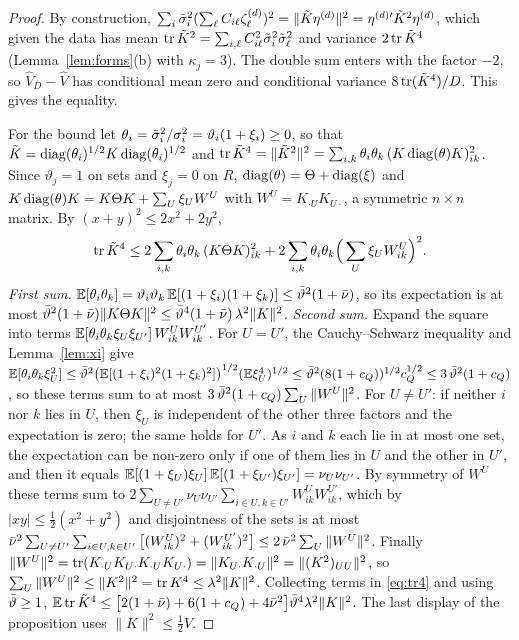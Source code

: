 \begin{proof}
By construction,
$\sum_i\tilde\sigma_i^2(\sum_\ell C_{i\ell}\zeta^{(d)}_\ell)^2=\|\tilde K\eta^{(d)}\|^2=\eta^{(d)\prime}\tilde K^2\eta^{(d)}$,
which given the data has mean $\operatorname{tr}\tilde K^2=\sum_{i,\ell}C_{i\ell}^2\tilde\sigma_i^2\tilde\sigma_\ell^2$ and variance
$2\operatorname{tr}\tilde K^4$ (Lemma~\ref{lem:forms}(b) with $\kappa_j=3$). The double sum enters with the factor
$-2$, so $\hat V_D-\hat V$ has conditional mean zero and conditional variance $8\operatorname{tr}(\tilde K^4)/D$.
This gives the equality.

For the bound let $\theta_i=\tilde\sigma_i^2/\sigma_i^2=\vartheta_i(1+\xi_i)\ge0$, so that
$\tilde K=\operatorname{diag}(\theta_i)^{1/2}K\operatorname{diag}(\theta_i)^{1/2}$ and
$\operatorname{tr}\tilde K^4=\|\tilde K^2\|^2=\sum_{i,k}\theta_i\theta_k\,(K\operatorname{diag}(\theta)K)_{ik}^2$. Since $\vartheta_j=1$ on
sets and $\xi_j=0$ on $R$, $\operatorname{diag}(\theta)=\Theta+\operatorname{diag}(\xi)$ and
$K\operatorname{diag}(\theta)K=K\Theta K+\sum_U\xi_UW^U$ with $W^U=K_{\cdot U}K_{U\cdot}$, a symmetric $n\times n$
matrix. By $(x+y)^2\le2x^2+2y^2$,
\begin{equation}\label{eq:tr4}
\operatorname{tr}\tilde K^4\le2\sum_{i,k}\theta_i\theta_k\,(K\Theta K)_{ik}^2+2\sum_{i,k}\theta_i\theta_k\Big(\sum_U\xi_UW^U_{ik}\Big)^2 .
\end{equation}
\emph{First sum.} $\mathbb{E}[\theta_i\theta_k]=\vartheta_i\vartheta_k\,\mathbb{E}[(1+\xi_i)(1+\xi_k)]\le\bar\vartheta^2(1+\bar\nu)$, so its
expectation is at most $\bar\vartheta^2(1+\bar\nu)\|K\Theta K\|^2\le\bar\vartheta^4(1+\bar\nu)\,\lambda^2\|K\|^2$.
\emph{Second sum.} Expand the square into terms $\mathbb{E}[\theta_i\theta_k\xi_U\xi_{U'}]\,W^U_{ik}W^{U'}_{ik}$.
For $U=U'$, the Cauchy--Schwarz inequality and Lemma~\ref{lem:xi} give
$\mathbb{E}[\theta_i\theta_k\xi_U^2]\le\bar\vartheta^2\big(\mathbb{E}[(1+\xi_i)^2(1+\xi_k)^2]\big)^{1/2}(\mathbb{E}\xi_U^4)^{1/2}
\le\bar\vartheta^2(8(1+c_Q))^{1/2}c_Q^{1/2}\le3\,\bar\vartheta^2(1+c_Q)$, so these terms sum to at most
$3\,\bar\vartheta^2(1+c_Q)\sum_U\|W^U\|^2$. For $U\ne U'$: if neither $i$ nor $k$ lies in $U$, then $\xi_U$ is
independent of the other three factors and the expectation is zero; the same holds for $U'$. As $i$
and $k$ each lie in at most one set, the expectation can be non-zero only if one of them lies in $U$
and the other in $U'$, and then it equals $\mathbb{E}[(1+\xi_U)\xi_U]\,\mathbb{E}[(1+\xi_{U'})\xi_{U'}]=\nu_U\nu_{U'}$.
By symmetry of $W^U$ these terms sum to
$2\sum_{U\ne U'}\nu_U\nu_{U'}\sum_{i\in U,k\in U'}W^U_{ik}W^{U'}_{ik}$, which by
$|xy|\le\frac12(x^2+y^2)$ and disjointness of the sets is at most
$\bar\nu^2\sum_{U\ne U'}\sum_{i\in U,k\in U'}\big[(W^U_{ik})^2+(W^{U'}_{ik})^2\big]\le2\,\bar\nu^2\sum_U\|W^U\|^2$.
Finally $\|W^U\|^2=\operatorname{tr}(K_{\cdot U}K_{U\cdot}K_{\cdot U}K_{U\cdot})=\|K_{U\cdot}K_{\cdot U}\|^2=\|(K^2)_{UU}\|^2$,
so $\sum_U\|W^U\|^2\le\|K^2\|^2=\operatorname{tr} K^4\le\lambda^2\|K\|^2$. Collecting terms in \eqref{eq:tr4} and using
$\bar\vartheta\ge1$, $\mathbb{E}\operatorname{tr}\tilde K^4\le\big[2(1+\bar\nu)+6(1+c_Q)+4\bar\nu^2\big]\bar\vartheta^4\lambda^2\|K\|^2$. The last
display of the proposition uses $\|K\|^2\le\frac12V$.
\end{proof}

